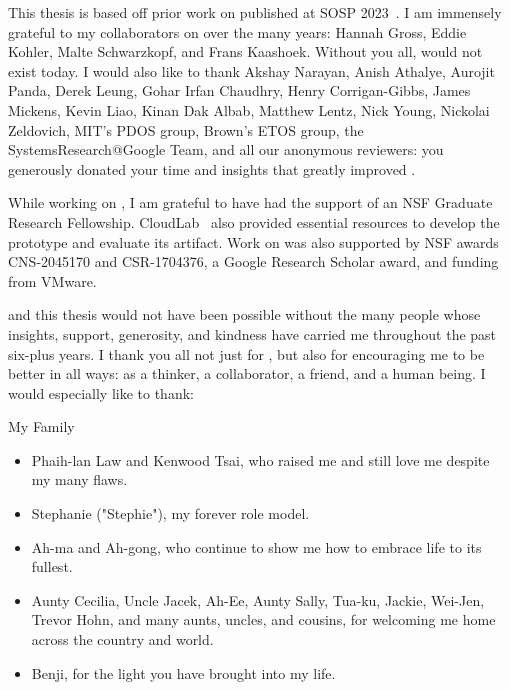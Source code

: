 %
This thesis is based off prior work on \sys published at SOSP 2023~\cite{edna}.
I am immensely grateful to my collaborators on \sys over the many years: Hannah
Gross, Eddie Kohler, Malte Schwarzkopf, and Frans Kaashoek. Without you all,
\sys would not exist today.
%
I would also like to thank Akshay Narayan, Anish Athalye, Aurojit Panda, Derek
Leung, Gohar Irfan Chaudhry, Henry Corrigan-Gibbs, James Mickens, Kevin Liao,
Kinan Dak Albab, Matthew Lentz, Nick Young, Nickolai Zeldovich, MIT's PDOS
group, Brown's ETOS group, the SystemsResearch@Google Team, and all our
anonymous reviewers: you generously donated your time and insights that greatly
improved \sys. 
%

%
While working on \sys, I am grateful to have had the support of an NSF Graduate
Research Fellowship.  CloudLab~\cite{cloudlab} also provided essential resources
to develop the \sys prototype and evaluate its artifact.
%
Work on \sys was also supported by NSF awards CNS-2045170 and CSR-1704376, a
Google Research Scholar award, and funding from VMware.
%

%
\sys and this thesis would not have been possible without the many people whose
insights, support, generosity, and kindness have carried me throughout the past
six-plus years.
%
I thank you all not just for \sys, but also for encouraging me to be better in
all ways: as a thinker, a collaborator, a friend, and a human being.
%
I would especially like to thank:

\begin{center}{My Family}\end{center}
    
    \begin{itemize}
    \item Phaih-lan Law and Kenwood Tsai, who raised me and still love me despite my many flaws. 
    
    \item Stephanie ("Stephie"), my forever role model. 
     
     \item Ah-ma and Ah-gong, who continue to show me how to embrace life to its fullest. 
        
    \item Aunty Cecilia, Uncle Jacek, Ah-Ee, Aunty
    Sally, Tua-ku, Jackie, Wei-Jen, Trevor Hohn, and many aunts, uncles, and cousins, for welcoming me home across the country and world.

    \item Benji, for the light you have brought into my life.
    \end{itemize}


